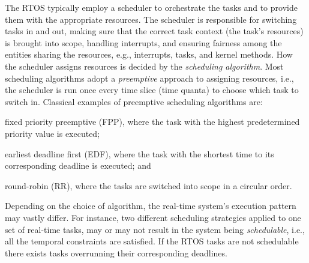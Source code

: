 The RTOS typically employ a scheduler to orchestrate the tasks and to provide them with the appropriate resources.
The scheduler is responsible for switching tasks in and out, making sure that the correct task context (the task's resources) is brought into scope, handling interrupts, and ensuring fairness among the entities sharing the resources, e.g., interrupts, tasks, and kernel methods.
How the scheduler assigns resources is decided by the \emph{scheduling algorithm}.
Most scheduling algorithms adopt a \emph{preemptive} approach to assigning resources, i.e., the scheduler is run once every time slice (time quanta) to choose which task to switch in.
Classical examples of preemptive scheduling algorithms are:
%
\begin{enumerate*}[label=(\roman*)]
    \item fixed priority preemptive (FPP), where the task with the highest predetermined priority value is executed;
    \item earliest deadline first (EDF), where the task with the shortest time to its corresponding deadline is executed; and
    \item round-robin (RR), where the tasks are switched into scope in a circular order.
\end{enumerate*}
%
Depending on the choice of algorithm, the real-time system's execution pattern may vastly differ.
For instance, two different scheduling strategies applied to one set of real-time tasks, may or may not result in the system being \emph{schedulable}, i.e., all the temporal constraints are satisfied.
If the RTOS tasks are not schedulable there exists tasks overrunning their corresponding deadlines.

